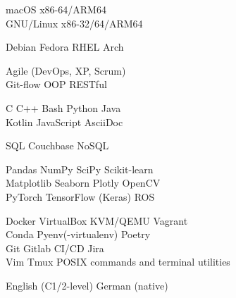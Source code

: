 \documentclass[a4paper]{./src/resume-cv}
\begin{document}
\begin{minipage}[t]{0.42\textwidth}
	\faApple\space\space macOS x86-64/ARM64\\
	\faLinux\space GNU/Linux x86-32/64/ARM64
	\subsectionsep

	Debian \bulletsep Fedora \bulletsep RHEL \bulletsep Arch
	\subsectionsep
	
	Agile (DevOps, XP, Scrum)\\
	Git-flow \bulletsep OOP \bulletsep RESTful
	\subsectionsep

	C \bulletsep C++ \bulletsep Bash \bulletsep Python \bulletsep Java \\
	Kotlin \bulletsep JavaScript \bulletsep AsciiDoc \bulletsep \latex
	\subsectionsep
	
	SQL \bulletsep Couchbase NoSQL
	\subsectionsep

	Pandas \bulletsep NumPy \bulletsep SciPy \bulletsep Scikit-learn\\
	Matplotlib \bulletsep Seaborn \bulletsep Plotly \bulletsep OpenCV\\
	PyTorch \bulletsep TensorFlow (Keras) \bulletsep ROS
	\subsectionsep

	Docker \bulletsep VirtualBox \bulletsep KVM/QEMU \bulletsep Vagrant\\
	Conda \bulletsep Pyenv(-virtualenv) \bulletsep Poetry\\
	Git \bulletsep Gitlab CI/CD \bulletsep Jira \\
	Vim \bulletsep Tmux \bulletsep POSIX commands and terminal utilities\\
	
	\subsectionsep
	
	English (C1/2-level) \bulletsep German (native)

\end{minipage}\quad %
\hfill %
\end{document}
